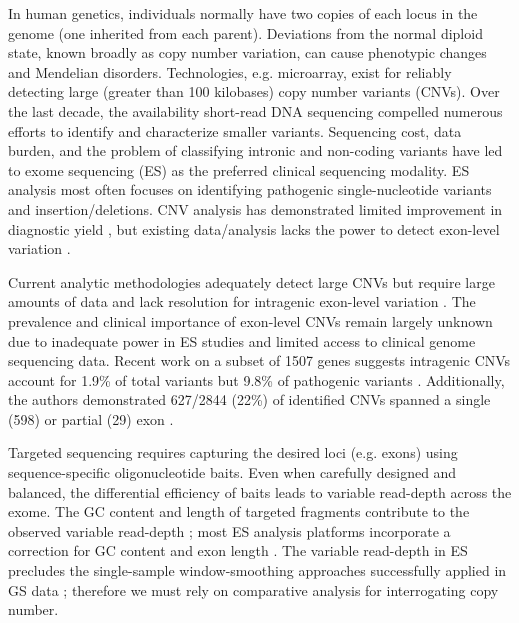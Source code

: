 \documentclass{bmcart}\usepackage[]{graphicx}\usepackage[]{color}
\begin{document}
In human genetics, individuals normally have two copies of each locus in the genome (one inherited from each parent).
Deviations from the normal diploid state, known broadly as copy number variation, can cause phenotypic changes and Mendelian disorders.
Technologies, e.g. microarray, exist for reliably detecting large (greater than 100 kilobases) copy number variants (CNVs).
Over the last decade, the availability short-read DNA sequencing compelled numerous efforts to identify and characterize smaller variants.
Sequencing cost, data burden, and the problem of classifying intronic and non-coding variants have led to exome sequencing (ES) as the preferred clinical sequencing modality.
ES analysis most often focuses on identifying pathogenic single-nucleotide variants and insertion/deletions.
CNV analysis has demonstrated limited improvement in diagnostic yield \cite{marchuk:2018aa}, but existing data/analysis lacks the power to detect exon-level variation \cite{retterer:2015aa,yao:2017aa}.

Current analytic methodologies adequately detect large CNVs but require large amounts of data and lack resolution for intragenic exon-level variation \cite{plagnol:2012aa,krumm:2012aa,fromer:2012aa,jiang:2015aa}.
The prevalence and clinical importance of exon-level CNVs remain largely unknown due to inadequate power in ES studies and limited access to clinical genome sequencing data.
Recent work on a subset of 1507 genes suggests intragenic CNVs account for 1.9\% of total variants but 9.8\% of pathogenic variants \cite{truty:2019aa}.
Additionally, the authors demonstrated 627/2844 (22\%) of identified CNVs spanned a single (598) or partial (29) exon \cite{truty:2019aa}.

Targeted sequencing requires capturing the desired loci (e.g. exons) using sequence-specific oligonucleotide baits.
Even when carefully designed and balanced, the differential efficiency of baits leads to variable read-depth across the exome.
The GC content and length of targeted fragments contribute to the observed variable read-depth \cite{benjamini:2012aa}; most ES analysis platforms incorporate a correction for GC content and exon length \cite{kadalayil:2015aa}.
The variable read-depth in ES precludes the single-sample window-smoothing approaches successfully applied in GS data \cite{chiang:2009aa}; therefore we must rely on comparative analysis for interrogating copy number.
\end{document}
